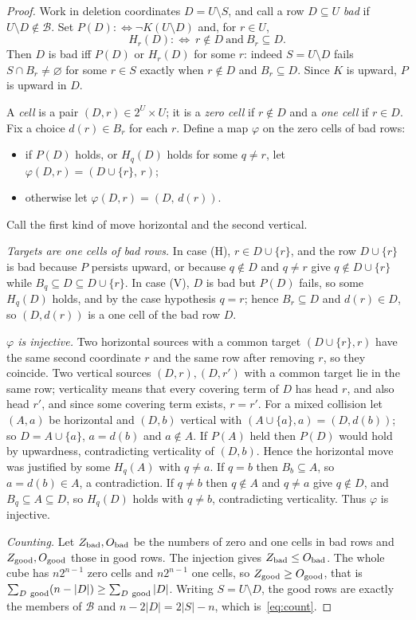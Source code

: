 \documentclass[11pt,a4paper]{article}
\theoremstyle{plain}
\theoremstyle{definition}
\theoremstyle{remark}
\newcommand{\BB}{\mathcal B}
\begin{document}
\begin{proof}
Work in deletion coordinates $D=U\setminus S$, and call a row $D\subseteq U$ \emph{bad} if
$U\setminus D\notin\BB$. Set $P(D):\Leftrightarrow\neg K(U\setminus D)$ and, for $r\in U$,
\[
H_r(D):\Leftrightarrow\ r\notin D\ \text{and}\ B_r\subseteq D .
\]
Then $D$ is bad iff $P(D)$ or $H_r(D)$ for some $r$: indeed $S=U\setminus D$ fails
$S\cap B_r\neq\varnothing$ for some $r\in S$ exactly when $r\notin D$ and $B_r\subseteq D$.
Since $K$ is upward, $P$ is upward in $D$.

A \emph{cell} is a pair $(D,r)\in2^U\times U$; it is a \emph{zero cell} if $r\notin D$ and a
\emph{one cell} if $r\in D$. Fix a choice $d(r)\in B_r$ for each $r$. Define a map $\varphi$
on the zero cells of bad rows:
\begin{itemize}
\item[(H)] if $P(D)$ holds, or $H_q(D)$ holds for some $q\neq r$, let $\varphi(D,r)=(D\cup\{r\},\,r)$;
\item[(V)] otherwise let $\varphi(D,r)=(D,\,d(r))$.
\end{itemize}
Call the first kind of move horizontal and the second vertical.

\emph{Targets are one cells of bad rows.} In case (H), $r\in D\cup\{r\}$, and the row
$D\cup\{r\}$ is bad because $P$ persists upward, or because $q\notin D$ and $q\neq r$ give
$q\notin D\cup\{r\}$ while $B_q\subseteq D\subseteq D\cup\{r\}$. In case (V), $D$ is bad but
$P(D)$ fails, so some $H_q(D)$ holds, and by the case hypothesis $q=r$; hence
$B_r\subseteq D$ and $d(r)\in D$, so $(D,d(r))$ is a one cell of the bad row $D$.

\emph{$\varphi$ is injective.} Two horizontal sources with a common target
$(D\cup\{r\},r)$ have the same second coordinate $r$ and the same row after removing $r$,
so they coincide. Two vertical sources $(D,r),(D,r')$ with a common target lie in the same
row; verticality means that every covering term of $D$ has head $r$, and also head $r'$,
and since some covering term exists, $r=r'$. For a mixed collision let $(A,a)$ be
horizontal and $(D,b)$ vertical with $(A\cup\{a\},a)=(D,d(b))$; so $D=A\cup\{a\}$,
$a=d(b)$ and $a\notin A$. If $P(A)$ held then $P(D)$ would hold by upwardness, contradicting
verticality of $(D,b)$. Hence the horizontal move was justified by some $H_q(A)$ with
$q\neq a$. If $q=b$ then $B_b\subseteq A$, so $a=d(b)\in A$, a contradiction. If $q\neq b$
then $q\notin A$ and $q\neq a$ give $q\notin D$, and $B_q\subseteq A\subseteq D$, so
$H_q(D)$ holds with $q\neq b$, contradicting verticality. Thus $\varphi$ is injective.

\emph{Counting.} Let $Z_{\rm bad},O_{\rm bad}$ be the numbers of zero and one cells in bad
rows and $Z_{\rm good},O_{\rm good}$ those in good rows. The injection gives
$Z_{\rm bad}\le O_{\rm bad}$. The whole cube has $n2^{n-1}$ zero cells and $n2^{n-1}$ one
cells, so $Z_{\rm good}\ge O_{\rm good}$, that is
$\sum_{D\ \rm good}(n-|D|)\ge\sum_{D\ \rm good}|D|$. Writing $S=U\setminus D$, the good rows
are exactly the members of $\BB$ and $n-2|D|=2|S|-n$, which is~\eqref{eq:count}.
\end{proof}
\end{document}
